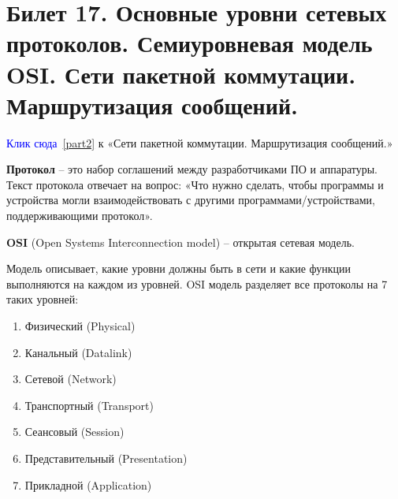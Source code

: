 \newpage
\section{Билет 17. Основные уровни сетевых протоколов. Семиуровневая модель OSI. Сети пакетной коммутации. Маршрутизация сообщений.}

\textcolor{blue}{Клик сюда~\ref{part2}} к «Сети пакетной коммутации. Маршрутизация сообщений.»

\textbf{Протокол} -- это набор соглашений между разработчиками ПО и аппаратуры. Текст протокола отвечает на вопрос: «Что нужно сделать, чтобы программы и устройства могли взаимодействовать с другими программами/устройствами, поддерживающими протокол».

\textbf{OSI} (Open Systems Interconnection model) -- открытая сетевая модель.

Модель описывает, какие уровни должны быть в сети и какие функции выполняются на каждом из уровней. OSI модель разделяет все протоколы на 7 таких уровней:
\begin{enumerate}
\item Физический (Physical)
\item Канальный (Datalink)
\item Сетевой (Network)
\item Транспортный (Transport)
\item Сеансовый (Session)
\item Представительный (Presentation)
\item Прикладной (Application)
\end{enumerate}

